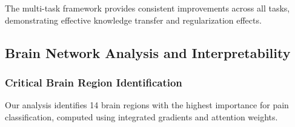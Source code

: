 \documentclass[10pt,journal,compsoc]{IEEEtran}
\begin{document}
The multi-task framework provides consistent improvements across all tasks, demonstrating effective knowledge transfer and regularization effects.

\subsection{Brain Network Analysis and Interpretability}

\subsubsection{Critical Brain Region Identification}

Our analysis identifies 14 brain regions with the highest importance for pain classification, computed using integrated gradients and attention weights.
\end{document}
